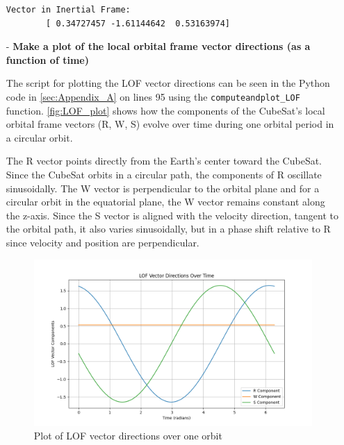 \begin{itemize}
\begin{lstlisting}[frame=single]
        Vector in Inertial Frame:
        [ 0.34727457 -1.61144642  0.53163974]
    \end{lstlisting}

    \newpage
    \item[-] \textbf{Make a plot of the local orbital frame vector directions (as a function of time)}

    The script for plotting the LOF vector directions can be seen in the Python code in \autoref{sec:Appendix_A} on lines 95 using the \verb|computeandplot_LOF| function.
    \autoref{fig:LOF_plot} shows how the components of the CubeSat's local orbital frame vectors (R, W, S) evolve over time during one orbital period in a circular orbit.

    The R vector points directly from the Earth’s center toward the CubeSat.
    Since the CubeSat orbits in a circular path, the components of R oscillate sinusoidally.     
    The W vector is perpendicular to the orbital plane and for a circular orbit in the equatorial plane, the W vector remains constant along the z-axis.    
    Since the S vector is aligned with the velocity direction, tangent to the orbital path, it also varies sinusoidally, but in a phase shift relative to R since velocity and position are perpendicular.

    \begin{figure}[h]
        \centering
        \includegraphics[width=\linewidth]{Doc/Graphics/LOF_vector_directions_plot.png}
        \caption{Plot of LOF vector directions over one orbit}
        \label{fig:LOF_plot}
    \end{figure}
\end{itemize}
